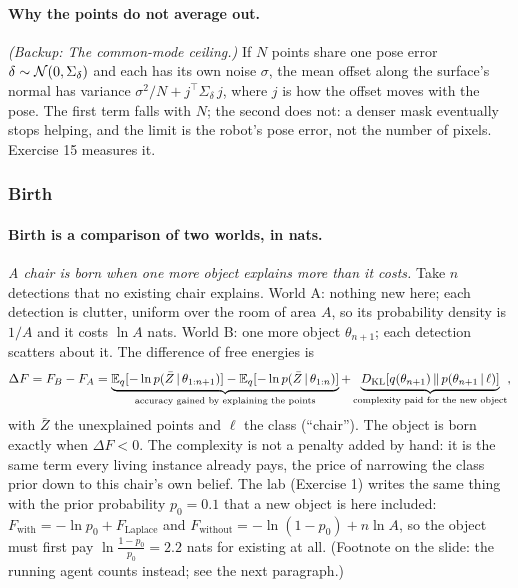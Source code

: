 \documentclass[11pt]{article}
\newcommand{\slt}[1]{\emph{#1}}   %
\begin{document}
\paragraph{Why the points do not average out.} \slt{(Backup: The common-mode ceiling.)} If $N$ points share one pose error $\delta\sim\mathcal{N}(0,\Sigma_\delta)$ and each has its own noise $\sigma$, the mean offset along the surface's normal has variance $\sigma^2/N+j^\top\Sigma_\delta\, j$, where $j$ is how the offset moves with the pose. The first term falls with $N$; the second does not: a denser mask eventually stops helping, and the limit is the robot's pose error, not the number of pixels. Exercise 15 measures it.

\subsubsection*{Birth}

\paragraph{Birth is a comparison of two worlds, in nats.} \slt{A chair is born when one more object explains more than it costs.} Take $n$ detections that no existing chair explains. World A: nothing new here; each detection is clutter, uniform over the room of area $A$, so its probability density is $1/A$ and it costs $\ln A$ nats. World B: one more object $\theta_{n+1}$; each detection scatters about it. The difference of free energies is
\[
\Delta F=F_B-F_A=\underbrace{\mathbb{E}_q[-\ln p(\bar Z\,|\,\theta_{1:n+1})]-\mathbb{E}_q[-\ln p(\bar Z\,|\,\theta_{1:n})]}_{\text{accuracy gained by explaining the points}}+\underbrace{D_{\mathrm{KL}}\!\left[q(\theta_{n+1})\,\middle\|\,p(\theta_{n+1}\,|\,\ell)\right]}_{\text{complexity paid for the new object}} ,
\]
with $\bar Z$ the unexplained points and $\ell$ the class (``chair''). The object is born exactly when $\Delta F<0$. The complexity is not a penalty added by hand: it is the same term every living instance already pays, the price of narrowing the class prior down to this chair's own belief. The lab (Exercise 1) writes the same thing with the prior probability $p_0=0.1$ that a new object is here included: $F_{\text{with}}=-\ln p_0+F_{\text{Laplace}}$ and $F_{\text{without}}=-\ln(1-p_0)+n\ln A$, so the object must first pay $\ln\frac{1-p_0}{p_0}=2.2$ nats for existing at all. (Footnote on the slide: the running agent counts instead; see the next paragraph.)
\end{document}

